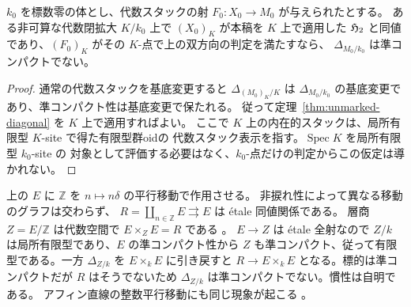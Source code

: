 \begin{corollary}[基礎体の拡大]\label{cor:unmarked-diagonal-extension}
$k_0$ を標数零の体とし、代数スタックの射 $F_0:X_0\to M_0$ が与えられたとする。
ある非可算な代数閉拡大 $K/k_0$ 上で $(X_0)_K$ が本稿を $K$ 上で適用した
$\mathfrak H_2$ と同値であり、$(F_0)_K$ がその $K$-点で上の双方向の判定を満たすなら、
$\Delta_{M_0/k_0}$ は準コンパクトでない。
\end{corollary}
\begin{proof}
通常の代数スタックを基底変更すると $\Delta_{(M_0)_K/K}$ は
$\Delta_{M_0/k_0}$ の基底変更であり、準コンパクト性は基底変更で保たれる。
従って定理~\ref{thm:unmarked-diagonal} を $K$ 上で適用すればよい。
ここで $K$ 上の内在的スタックは、局所有限型 $K$-site で得た有限型群oidの
代数スタック表示を指す。$\operatorname{Spec}K$ を局所有限型 $k_0$-site の
対象として評価する必要はなく、$k_0$-点だけの判定からこの仮定は導かれない。
\end{proof}

\begin{example}[非準分離な有限型商]\label{ex:unmarked-translation-quotient}
上の $E$ に $\mathbb Z$ を $n\mapsto n\delta$ の平行移動で作用させる。
非捩れ性によって異なる移動のグラフは交わらず、
$R=\coprod_{n\in\mathbb Z}E\rightrightarrows E$ は étale 同値関係である。
層商 $Z=E/\mathbb Z$ は代数空間で $E\times_ZE=R$ である
\cite[Tag 02Z0, Lemma 65.14.3]{StacksSmoothAtlas}。
$E\to Z$ は étale 全射なので $Z/k$ は局所有限型であり、$E$ の準コンパクト性から
$Z$ も準コンパクト、従って有限型である。一方 $\Delta_{Z/k}$ を
$E\times_k E$ に引き戻すと $R\to E\times_k E$ となる。標的は準コンパクトだが
$R$ はそうでないため $\Delta_{Z/k}$ は準コンパクトでない。慣性は自明である。
アフィン直線の整数平行移動にも同じ現象が起こる
\cite[Tags 02Z0, 06E9]{StacksSmoothAtlas}。
\end{example}
